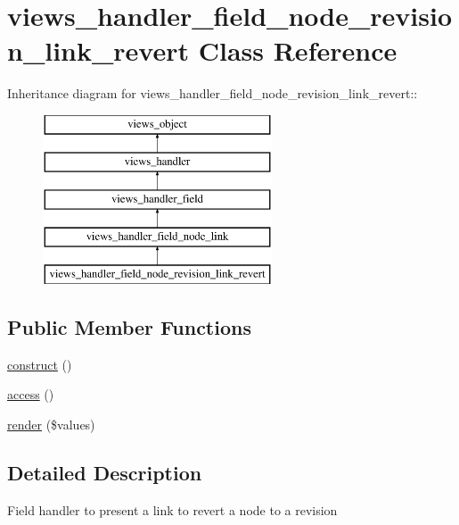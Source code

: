 \hypertarget{classviews__handler__field__node__revision__link__revert}{
\section{views\_\-handler\_\-field\_\-node\_\-revision\_\-link\_\-revert Class Reference}
\label{classviews__handler__field__node__revision__link__revert}
}
Inheritance diagram for views\_\-handler\_\-field\_\-node\_\-revision\_\-link\_\-revert::\begin{figure}[H]
\begin{center}
\leavevmode
\includegraphics[height=5cm]{classviews__handler__field__node__revision__link__revert}
\end{center}
\end{figure}
\subsection*{Public Member Functions}
\begin{CompactItemize}
\item 
\hyperlink{classviews__handler__field__node__revision__link__revert_51850ebf69c6cdbc043378a538931fc0}{construct} ()
\item 
\hyperlink{classviews__handler__field__node__revision__link__revert_6cb6e683478e55b9e3e64602dbc8886d}{access} ()
\item 
\hyperlink{classviews__handler__field__node__revision__link__revert_eb4c6a3ba1544e14492bd1fec4ee4e91}{render} (\$values)
\end{CompactItemize}


\subsection{Detailed Description}
Field handler to present a link to revert a node to a revision 

